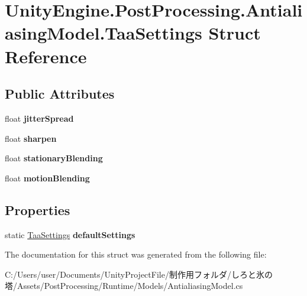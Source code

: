 \hypertarget{struct_unity_engine_1_1_post_processing_1_1_antialiasing_model_1_1_taa_settings}{}\section{Unity\+Engine.\+Post\+Processing.\+Antialiasing\+Model.\+Taa\+Settings Struct Reference}
\label{struct_unity_engine_1_1_post_processing_1_1_antialiasing_model_1_1_taa_settings}
\subsection*{Public Attributes}
\begin{DoxyCompactItemize}
\item 
\mbox{\label{struct_unity_engine_1_1_post_processing_1_1_antialiasing_model_1_1_taa_settings_a1fb4a56a3c4e2de6c9e9ab5b78c82b01}} 
float {\bfseries jitter\+Spread}
\item 
\mbox{\label{struct_unity_engine_1_1_post_processing_1_1_antialiasing_model_1_1_taa_settings_aac78045457513ebdfdf6b97490e6b181}} 
float {\bfseries sharpen}
\item 
\mbox{\label{struct_unity_engine_1_1_post_processing_1_1_antialiasing_model_1_1_taa_settings_a9c7bfc8641dc5b8229cb526b9a1e1aab}} 
float {\bfseries stationary\+Blending}
\item 
\mbox{\label{struct_unity_engine_1_1_post_processing_1_1_antialiasing_model_1_1_taa_settings_af1be8bba7027153437fcab9d9f143cf9}} 
float {\bfseries motion\+Blending}
\end{DoxyCompactItemize}
\subsection*{Properties}
\begin{DoxyCompactItemize}
\item 
\mbox{\label{struct_unity_engine_1_1_post_processing_1_1_antialiasing_model_1_1_taa_settings_a4399b2ac5c558bec9edc9af8d49b8928}} 
static \hyperlink{struct_unity_engine_1_1_post_processing_1_1_antialiasing_model_1_1_taa_settings}{Taa\+Settings} {\bfseries default\+Settings}
\end{DoxyCompactItemize}


The documentation for this struct was generated from the following file\+:\begin{DoxyCompactItemize}
\item 
C\+:/\+Users/user/\+Documents/\+Unity\+Project\+File/制作用フォルダ/しろと氷の塔/\+Assets/\+Post\+Processing/\+Runtime/\+Models/Antialiasing\+Model.\+cs\end{DoxyCompactItemize}
